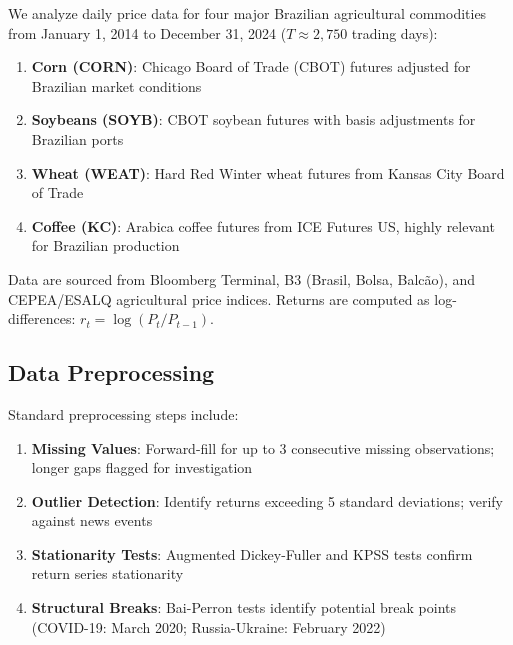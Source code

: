 \documentclass[
  10pt,
  a4paper,
]{article}
\providecommand{\tightlist}{%
  \setlength{\itemsep}{0pt}\setlength{\parskip}{0pt}}
\begin{document}
We analyze daily price data for four major Brazilian agricultural
commodities from January 1, 2014 to December 31, 2024
(\(T \approx 2,750\) trading days):

\begin{enumerate}
\def\labelenumi{\arabic{enumi}.}
\tightlist
\item
  \textbf{Corn (CORN)}: Chicago Board of Trade (CBOT) futures adjusted
  for Brazilian market conditions
\item
  \textbf{Soybeans (SOYB)}: CBOT soybean futures with basis adjustments
  for Brazilian ports\\
\item
  \textbf{Wheat (WEAT)}: Hard Red Winter wheat futures from Kansas City
  Board of Trade
\item
  \textbf{Coffee (KC)}: Arabica coffee futures from ICE Futures US,
  highly relevant for Brazilian production
\end{enumerate}

Data are sourced from Bloomberg Terminal, B3 (Brasil, Bolsa, Balcão),
and CEPEA/ESALQ agricultural price indices. Returns are computed as
log-differences: \(r_t = \log(P_t / P_{t-1})\).

\subsection{Data Preprocessing}\label{sec-preprocessing}

Standard preprocessing steps include:

\begin{enumerate}
\def\labelenumi{\arabic{enumi}.}
\tightlist
\item
  \textbf{Missing Values}: Forward-fill for up to 3 consecutive missing
  observations; longer gaps flagged for investigation
\item
  \textbf{Outlier Detection}: Identify returns exceeding 5 standard
  deviations; verify against news events
\item
  \textbf{Stationarity Tests}: Augmented Dickey-Fuller and KPSS tests
  confirm return series stationarity
\item
  \textbf{Structural Breaks}: Bai-Perron tests identify potential break
  points (COVID-19: March 2020; Russia-Ukraine: February 2022)
\end{enumerate}
\end{document}
